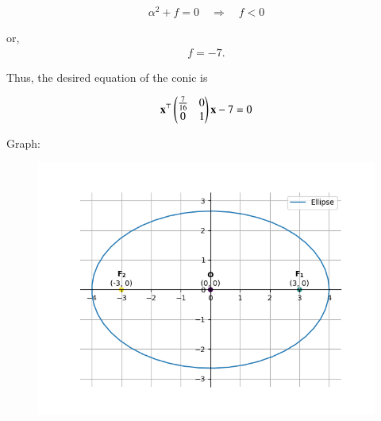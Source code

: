 \documentclass[journal,12pt,onecolumn]{IEEEtran}
\begin{document}
\begin{align}
\alpha^2 + f = 0 \quad \Longrightarrow \quad f < 0
\end{align}

or,  
\begin{align}
f = -7.
\end{align}

Thus, the desired equation of the conic is  

\begin{align}
		\mathbf{x}^\top 
\begin{pmatrix}
\frac{7}{16} & 0 \\ 
0 & 1
\end{pmatrix} 
		\mathbf{x} - 7 = 0
\end{align}

	Graph:
\begin{figure}[h!]
	\centering
	\includegraphics[width=0.7\linewidth]{img.png}
\end{figure}
\end{document}

